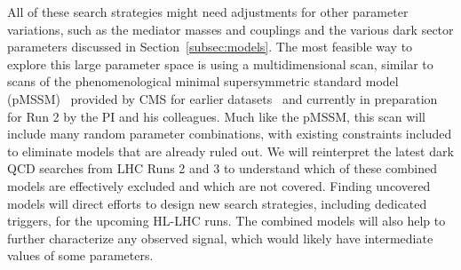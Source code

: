 All of these search strategies might need adjustments for other parameter variations,
such as the mediator masses and couplings and the various dark sector parameters discussed in Section~\ref{subsec:models}.
The most feasible way to explore this large parameter space is using a multidimensional scan,
similar to scans of the phenomenological minimal supersymmetric standard model (pMSSM)~\cite{Djouadi:1998di}
provided by CMS for earlier datasets~\cite{Khachatryan:2016nvf,SUS-16-033-supp} and currently in preparation for Run 2 by the PI and his colleagues.
Much like the pMSSM, this scan will include many random parameter combinations, with existing constraints included to eliminate models that are already ruled out.
We will reinterpret the latest dark QCD searches from LHC Runs 2 and 3 to understand which of these combined models are effectively excluded and which are not covered.
Finding uncovered models will direct efforts to design new search strategies, including dedicated triggers, for the upcoming HL-LHC runs.
The combined models will also help to further characterize any observed signal, which would likely have intermediate values of some parameters.

